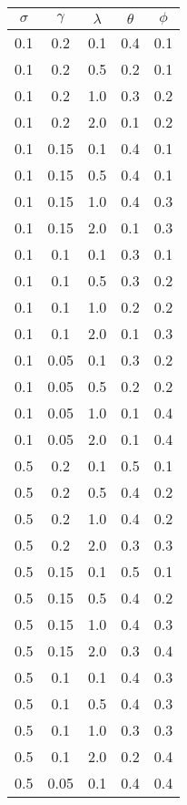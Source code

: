 \begin{table}[ht]
\centering
\begin{tabular}{c|c|c|c|c}
\hline
$\sigma$ & $\gamma$ & $\lambda$ & $\theta$ & $\phi$\\
\hline


0.1 & 0.2 & 0.1 & 0.4 & 0.1 \\
0.1 & 0.2 & 0.5 & 0.2 & 0.1 \\
0.1 & 0.2 & 1.0 & 0.3 & 0.2 \\
0.1 & 0.2 & 2.0 & 0.1 & 0.2 \\
0.1 & 0.15 & 0.1 & 0.4 & 0.1 \\
0.1 & 0.15 & 0.5 & 0.4 & 0.1 \\
0.1 & 0.15 & 1.0 & 0.4 & 0.3 \\
0.1 & 0.15 & 2.0 & 0.1 & 0.3 \\
0.1 & 0.1 & 0.1 & 0.3 & 0.1 \\
0.1 & 0.1 & 0.5 & 0.3 & 0.2 \\
0.1 & 0.1 & 1.0 & 0.2 & 0.2 \\
0.1 & 0.1 & 2.0 & 0.1 & 0.3 \\
0.1 & 0.05 & 0.1 & 0.3 & 0.2 \\
0.1 & 0.05 & 0.5 & 0.2 & 0.2 \\
0.1 & 0.05 & 1.0 & 0.1 & 0.4 \\
0.1 & 0.05 & 2.0 & 0.1 & 0.4 \\
0.5 & 0.2 & 0.1 & 0.5 & 0.1 \\
0.5 & 0.2 & 0.5 & 0.4 & 0.2 \\
0.5 & 0.2 & 1.0 & 0.4 & 0.2 \\
0.5 & 0.2 & 2.0 & 0.3 & 0.3 \\
0.5 & 0.15 & 0.1 & 0.5 & 0.1 \\
0.5 & 0.15 & 0.5 & 0.4 & 0.2 \\
0.5 & 0.15 & 1.0 & 0.4 & 0.3 \\
0.5 & 0.15 & 2.0 & 0.3 & 0.4 \\
0.5 & 0.1 & 0.1 & 0.4 & 0.3 \\
0.5 & 0.1 & 0.5 & 0.4 & 0.3 \\
0.5 & 0.1 & 1.0 & 0.3 & 0.3 \\
0.5 & 0.1 & 2.0 & 0.2 & 0.4 \\
0.5 & 0.05 & 0.1 & 0.4 & 0.4 \\

\end{tabular}
\end{table}
